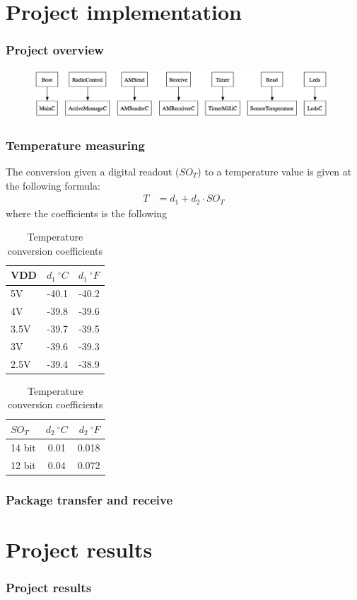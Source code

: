 \documentclass{beamer}
\begin{document}
\section{Project implementation}
\begin{frame}
\frametitle{Project overview}
\begin{figure}[htbp]
   \centering
   \includegraphics[width=11cm]{SWgraph.png} 
\end{figure}

\end{frame}

\begin{frame}
\frametitle{Temperature measuring}
The conversion given a digital readout ($SO_{T}$) to a temperature value is given at the following formula:
\begin{align*}
	T &= d_{1} + d_{2} \cdot SO_{T}
\end{align*}
where the coefficients is the following
\begin{table}[ht]
\centering
\begin{tabular}{ | l | c | r | }
	\hline
	VDD & $d_{1} \ ^{\circ}  C$ & $d_{1} \ ^{\circ}  F$ \\
	\hline \hline
	5V & -40.1 & -40.2 \\
	\hline
	4V & -39.8 & -39.6 \\
	\hline
	3.5V & -39.7 & -39.5 \\
	\hline
	3V & -39.6 & -39.3 \\
	\hline
	2.5V & -39.4 & -38.9 \\
	\hline
\end{tabular}
\begin{tabular}{ | l | c | r | }
	\hline
	$SO_{T}$ & $d_{2}  \ ^{\circ}C$ & $d_{2} \ ^{\circ} F$ \\
	\hline \hline
	14 bit & 0.01 & 0.018 \\
	\hline
	12 bit & 0.04 & 0.072\\
	\hline
\end{tabular}
\caption{Temperature conversion coefficients}
\label{table:temperature}
\end{table}

\end{frame}

\begin{frame}
\frametitle{Package transfer and receive}

\end{frame}


\section{Project results}

\begin{frame}
\frametitle{Project results}
 
\end{frame}
\end{document}

